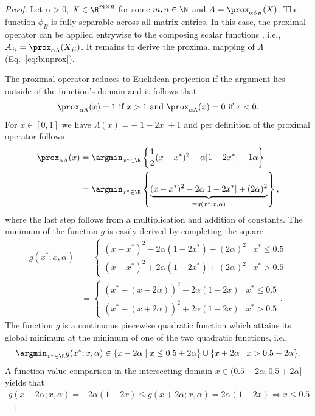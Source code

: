 \begin{proof}
Let $\alpha>0$, $X\in\R^{m\times n}$ for some $m,n\in\N$ and $A=\prox_{\alpha\phi_B}(X)$. The function $\phi_B$ is fully separable across all matrix entries. In this case, the proximal operator can be applied entrywise to the composing scalar functions \citep{parikh2014proximal}, i.e., $A_{ji}=\prox_{\alpha\Lambda}(X_{ji})$. It remains to derive the proximal mapping of $\Lambda$ (Eq.~\eqref{eq:binprox}).

The proximal operator reduces to Euclidean projection if the argument lies outside of the function's domain \citep{parikh2014proximal} and it follows that
\[\prox_{\alpha\Lambda}(x)=1 \text{ if } x>1 \text{ and }\prox_{\alpha\Lambda}(x)=0 \text{ if } x<0.\]
For $x\in[0,1]$ we have $\Lambda(x)=-\lvert 1-2x\rvert +1$ and per definition of the proximal operator follows
\begin{align*}
  \prox_{\alpha\Lambda}(x) &= \argmin_{x^*\in\R} \left\{\frac{1}{2}(x-x^*)^2-\alpha\lvert 1-2x^*\rvert  +1\alpha\right\}\\
  &= \argmin_{x^*\in\R} \left\{\underbrace{(x-x^*)^2-2\alpha\lvert 1-2x^*\rvert  +(2\alpha)^2}_{=g(x^*;x,\alpha)}\right\},
\end{align*}
where the last step follows from a multiplication and addition of constants. The minimum of the function $g$ is easily derived by completing the square
\begin{align*}
  g(x^*;x,\alpha) &=\begin{cases}
    (x-x^*)^2  -2\alpha(1-2 x^*) +(2\alpha)^2 & x^* \leq 0.5\\
    (x-x^*)^2 +2\alpha(1-2 x^*) +(2\alpha)^2 & x^*> 0.5
  \end{cases}\\
  &=
  \begin{cases}
    (x^*-(x-2\alpha))^2 -2\alpha( 1-2x)& x^* \leq 0.5\\
    (x^*-(x+2\alpha))^2 +2\alpha( 1-2x) & x^*> 0.5
  \end{cases}.
\end{align*}
The function $g$ is a continuous piecewise quadratic function which attains its global minimum at the minimum of one of the two quadratic functions, i.e.,
\[
  \argmin_{x^*\in\R}g(x^*;x,\alpha) \in \{x-2\alpha\mid x\leq 0.5+2\alpha\}\cup \{x+2\alpha\mid x> 0.5-2\alpha\}.
\] 
A function value comparison in the intersecting domain $x\in(0.5-2\alpha,0.5+2\alpha]$ yields that
\begin{align*}
g(x-2\alpha;x,\alpha)=-2\alpha(1-2x)\leq g(x+2\alpha;x,\alpha) =2\alpha(1-2x) \Leftrightarrow x\leq 0.5
\end{align*}
\end{proof}
